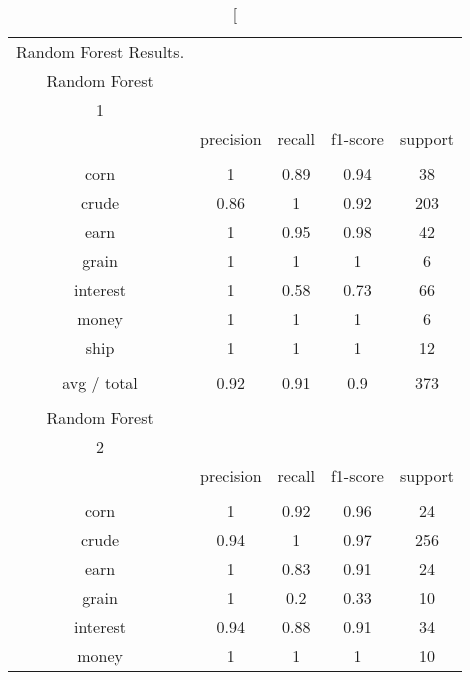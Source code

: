 \documentclass[11pt]{article}
\begin{document}
\begin{center}
\begin{longtable}{| c | c | c | c | c |}
\caption[Random Forest Results.} \\

Random Forest &           &        &          &         \\
1             &           &        &          &         \\
             & precision & recall & f1-score & support \\
             &           &        &          &         \\
corn          & 1         & 0.89   & 0.94     & 38      \\
crude         & 0.86      & 1      & 0.92     & 203     \\
earn          & 1         & 0.95   & 0.98     & 42      \\
grain         & 1         & 1      & 1        & 6       \\
interest      & 1         & 0.58   & 0.73     & 66      \\
money         & 1         & 1      & 1        & 6       \\
ship          & 1         & 1      & 1        & 12      \\
             &           &        &          &         \\
avg / total   & 0.92      & 0.91   & 0.9      & 373     \\
             &           &        &          &         \\
Random Forest &           &        &          &         \\
2             &           &        &          &         \\
             & precision & recall & f1-score & support \\
             &           &        &          &         \\
corn          & 1         & 0.92   & 0.96     & 24      \\
crude         & 0.94      & 1      & 0.97     & 256     \\
earn          & 1         & 0.83   & 0.91     & 24      \\
grain         & 1         & 0.2    & 0.33     & 10      \\
interest      & 0.94      & 0.88   & 0.91     & 34      \\
money         & 1         & 1      & 1        & 10      \\

\end{longtable}
\end{center}
\end{document}
